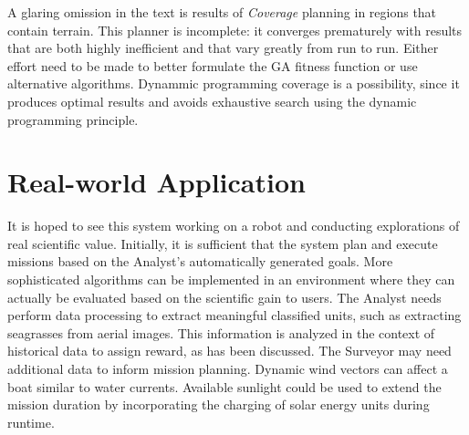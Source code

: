 \documentclass{tamuccthesis}
\begin{document}
A glaring omission in the text is results of \textit{Coverage} planning in regions that contain terrain. This planner is incomplete: it converges prematurely with results that are both highly inefficient and that vary greatly from run to run. Either effort need to be made to better formulate the GA fitness function or use alternative algorithms. Dynammic programming coverage is a possibility, since it produces optimal results and avoids exhaustive search using the dynamic programming principle. 

\section{Real-world Application}

It is hoped to see this system working on a robot and conducting explorations of real scientific value. Initially, it is sufficient that the system plan and execute missions based on the Analyst's automatically generated goals. More sophisticated algorithms can be implemented in an environment where they can actually be evaluated based on the scientific gain to users. The Analyst needs perform data processing to extract meaningful classified units, such as extracting seagrasses from aerial images. This information is analyzed in the context of historical data to assign reward, as has been discussed. The Surveyor may need additional data to inform mission planning. Dynamic wind vectors can affect a boat similar to water currents. Available sunlight could be used to extend the mission duration by incorporating the charging of solar energy units during runtime.  
\end{document}
